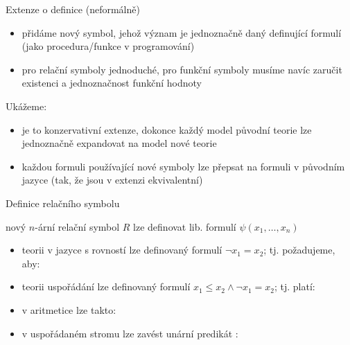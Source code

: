 \documentclass{beamer}
\begin{document}
\begin{frame}{Extenze o definice (neformálně)}

    \pause 
    \begin{itemize}
        \item přidáme nový symbol, jehož význam je jednoznačně daný \alert{definující formulí} (jako procedura/funkce v programování)\pause 
        \item pro relační symboly jednoduché, pro funkční symboly musíme navíc zaručit \alert{existenci} a \alert{jednoznačnost} funkční hodnoty\pause 
    \end{itemize}

    Ukážeme:\pause 
    \begin{itemize}
        \item je to konzervativní extenze, dokonce každý model původní teorie lze \alert{jednoznačně} expandovat na model nové teorie\pause 
        \item každou formuli používající nové symboly lze přepsat na  formuli v původním jazyce (tak, že jsou v extenzi ekvivalentní)
    \end{itemize}

\end{frame}


\begin{frame}{Definice relačního symbolu}
    
    \pause 
    nový $n$-ární relační symbol $R$ lze definovat lib. formulí $\psi(x_1,\dots,x_n)$

    \pause 
    \begin{itemize}
        \item teorii v jazyce s rovností lze  \alert{definovaný} formulí \alert{$\neg x_1=x_2$}; tj. požadujeme, aby:\pause 
        \item teorii uspořádání lze  definovaný formulí \alert{$x_1\leq x_2\land \neg x_1=x_2$}; tj. platí:\pause 
        \item v aritmetice lze  takto:\pause 
        \item v uspořádaném stromu lze zavést unární predikát :
        \pause 
    \end{itemize}

    \medskip


\end{frame}
\end{document}
